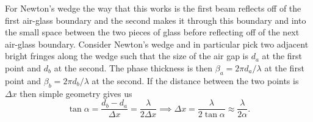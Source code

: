     For Newton's wedge the way that this works is the first beam reflects off of the first air-glass boundary and the second makes it through this boundary and into the small space between the two pieces of glass before reflecting off of the next air-glass boundary.
    Consider Newton's wedge and in particular pick two adjacent bright fringes along the wedge such that the size of the air gap is \(d_a\) at the first point and \(d_b\) at the second.
    The phase thickness is then \(\beta_a = 2\pi d_a/\lambda\) at the first point and \(\beta_b = 2\pi d_b/\lambda\) at the second.
    If the distance between the two points is \(\Delta x\) then simple geometry gives us
    \[\tan\alpha = \frac{d_b - d_a}{\Delta x} = \frac{\lambda}{2\Delta x} \implies \Delta x = \frac{\lambda}{2\tan\alpha} \approx \frac{\lambda}{2\alpha}.\]
    
